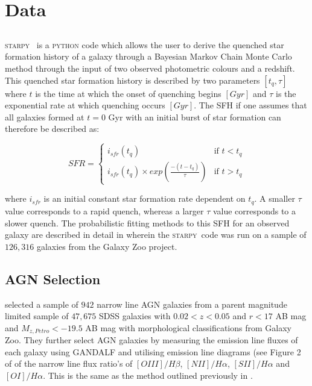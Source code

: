 \documentclass[useAMS,usenatbib]{mn2e}
\def\starpy {\textsc{starpy}}
\begin{document}
\section{Data}

\subsection{}

\starpy~ is a \textsc{python} code which allows the user to derive the quenched star formation history of a galaxy through a Bayesian Markov Chain Monte Carlo method through the input of two observed photometric colours and a redshift. This quenched star formation history is described by two parameters $[t_q, \tau]$ where $t$ is the time at which the onset of quenching begins $[Gyr]$ and $\tau$ is the exponential rate at which quenching occurs $[Gyr]$. The SFH if one assumes that all galaxies formed at $t=0$ Gyr with an initial burst of star formation can therefore be described as: 

\begin{equation}\label{sfh}
SFR =
\begin{cases}
i_{sfr}(t_q) & \text{if } t < t_q \\
i_{sfr}(t_q) \times exp{\left( \frac{-(t-t_{q})}{\tau}\right)} & \text{if } t > t_q 
\end{cases}
\end{equation}

where $i_{sfr}$ is an initial constant star formation rate dependent on $t_q$.  A smaller $\tau$ value corresponds to a rapid quench, whereas a larger $\tau$ value corresponds to a slower quench. The probabilistic fitting methods to this SFH for an observed galaxy are described in detail in \cite{Sme2015} wherein the \starpy ~code was run on a sample of $126,316$ galaxies from the Galaxy Zoo project. 

\subsection{AGN Selection}

\cite{Sch2010} selected a sample of $942$ narrow line AGN galaxies from a parent magnitude limited sample of $47,675$ SDSS galaxies with $0.02 < z < 0.05$ and $r < 17$ AB mag and $M_{z, Petro} < -19.5$ AB mag with morphological classifications from Galaxy Zoo. They further select AGN galaxies by measuring the emission line fluxes of each galaxy using GANDALF \citep{Sar2006} and utilising emission line diagrams  (see Figure 2 of \citealt{Sch2010} of the narrow line flux ratio's of $[OIII]/H\beta$, $[NII]/H\alpha$, $[SII]/H\alpha$ and $[OI]/H\alpha$. This is the same as the method outlined previously in \cite{Sch07}. 
\end{document}
